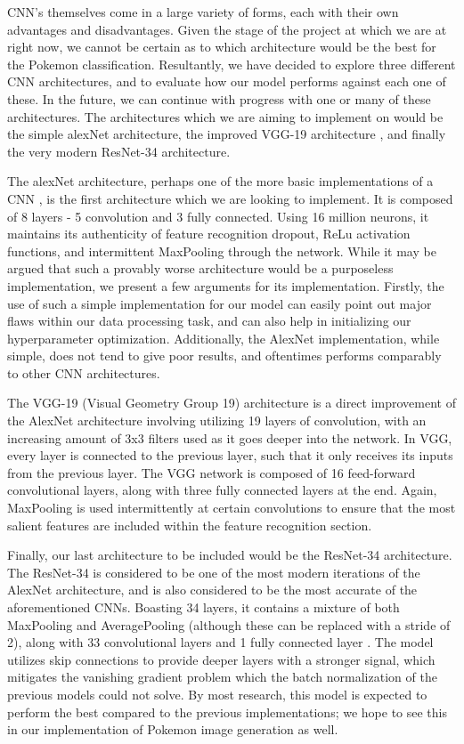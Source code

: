 \documentclass{article} %
\begin{document}
CNN's themselves come in a large variety of forms, each with their own advantages and disadvantages. Given the stage of the project at which we are at right now, we cannot be certain as to which architecture would be the best for the Pokemon classification. Resultantly, we have decided to explore three different CNN architectures, and to evaluate how our model performs against each one of these. In the future, we can continue with progress with one or many of these architectures. The architectures which we are aiming to implement on would be the simple alexNet architecture, the improved VGG-19 architecture \citep{AlexNetVsVGG19}, and finally the very modern ResNet-34 architecture. 

The alexNet architecture, perhaps one of the more basic implementations of a CNN \citep{alexNetHistory}, is the first architecture which we are looking to implement. It is composed of 8 layers - 5 convolution and 3 fully connected. Using 16 million neurons, it maintains its authenticity of feature recognition dropout, ReLu activation functions, and intermittent MaxPooling through the network. While it may be argued that such a provably worse architecture would be a purposeless implementation, we present a few arguments for its implementation. Firstly, the use of such a simple implementation for our model can easily point out major flaws within our data processing task, and can also help in initializing our hyperparameter optimization. Additionally, the AlexNet implementation, while simple, does not tend to give poor results, and oftentimes performs comparably to other CNN architectures.

The VGG-19 (Visual Geometry Group 19) architecture is a direct improvement of the AlexNet \citep{VGG19creation} architecture involving utilizing 19 layers of convolution, with an increasing amount of 3x3 filters used as it goes deeper into the network. In VGG, every layer is connected to the previous layer, such that it only receives its inputs from the previous layer. The VGG network is composed of 16 feed-forward convolutional layers, along with three fully connected layers at the end. Again, MaxPooling is used intermittently at certain convolutions to ensure that the most salient features are included within the feature recognition section. 

Finally, our last architecture to be included would be the ResNet-34 architecture. The ResNet-34 is considered to be one of the most modern iterations of the AlexNet architecture, and is also considered to be the most accurate of the aforementioned CNNs. Boasting 34 layers, it contains a mixture of both MaxPooling and AveragePooling (although these can be replaced with a stride of 2), along with 33 convolutional layers and 1 fully connected layer \citep{ResNet}. The model utilizes skip connections to provide deeper layers with a stronger signal, which mitigates the vanishing gradient problem which the batch normalization of the previous models could not solve. By most research, this model is expected to perform the best compared to the previous implementations; we hope to see this in our implementation of Pokemon image generation as well. 
\end{document}
